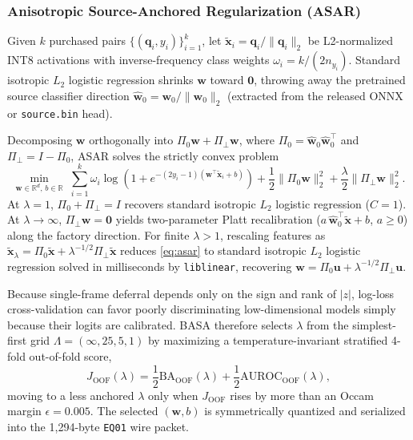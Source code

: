 \documentclass[preprint,12pt,authoryear]{elsarticle}
\newcommand{\BA}{\mathrm{BA}}
\begin{document}
\subsubsection{Anisotropic Source-Anchored Regularization (ASAR)}
Given $k$ purchased pairs $\{(\mathbf{q}_i, y_i)\}_{i=1}^k$, let $\tilde{\mathbf{x}}_i = \mathbf{q}_i / \|\mathbf{q}_i\|_2$ be L2-normalized INT8 activations with inverse-frequency class weights $\omega_i = k / (2 n_{y_i})$. Standard isotropic $L_2$ logistic regression shrinks $\mathbf{w}$ toward $\mathbf{0}$, throwing away the pretrained source classifier direction $\hat{\mathbf{w}}_0 = \mathbf{w}_0 / \|\mathbf{w}_0\|_2$ (extracted from the released ONNX or \texttt{source.bin} head).

Decomposing $\mathbf{w}$ orthogonally into $\Pi_0 \mathbf{w} + \Pi_\perp \mathbf{w}$, where $\Pi_0 = \hat{\mathbf{w}}_0 \hat{\mathbf{w}}_0^\top$ and $\Pi_\perp = I - \Pi_0$, ASAR solves the strictly convex problem
\begin{equation}
  \min_{\mathbf{w} \in \mathbb{R}^d,\, b \in \mathbb{R}} \;
  \sum_{i=1}^{k} \omega_i \log\!\left(1 + e^{-(2y_i-1)(\mathbf{w}^\top \tilde{\mathbf{x}}_i + b)}\right)
  + \frac{1}{2}\|\Pi_0 \mathbf{w}\|_2^2 + \frac{\lambda}{2}\|\Pi_\perp \mathbf{w}\|_2^2.
  \label{eq:asar}
\end{equation}
At $\lambda = 1$, $\Pi_0 + \Pi_\perp = I$ recovers standard isotropic $L_2$ logistic regression ($C=1$). At $\lambda \to \infty$, $\Pi_\perp \mathbf{w} = \mathbf{0}$ yields two-parameter Platt recalibration ($a\,\hat{\mathbf{w}}_0^\top \tilde{\mathbf{x}} + b$, $a \ge 0$) along the factory direction. For finite $\lambda > 1$, rescaling features as $\tilde{\mathbf{x}}_\lambda = \Pi_0 \tilde{\mathbf{x}} + \lambda^{-1/2}\Pi_\perp \tilde{\mathbf{x}}$ reduces \eqref{eq:asar} to standard isotropic $L_2$ logistic regression solved in milliseconds by \texttt{liblinear}, recovering $\mathbf{w} = \Pi_0 \mathbf{u} + \lambda^{-1/2}\Pi_\perp \mathbf{u}$.

Because single-frame deferral depends only on the sign and rank of $|z|$, log-loss cross-validation can favor poorly discriminating low-dimensional models simply because their logits are calibrated. BASA therefore selects $\lambda$ from the simplest-first grid $\Lambda = (\infty, 25, 5, 1)$ by maximizing a temperature-invariant stratified 4-fold out-of-fold score,
\begin{equation}
  J_{\mathrm{OOF}}(\lambda) = \frac{1}{2}\BA_{\mathrm{OOF}}(\lambda) + \frac{1}{2}\mathrm{AUROC}_{\mathrm{OOF}}(\lambda),
  \label{eq:oof}
\end{equation}
moving to a less anchored $\lambda$ only when $J_{\mathrm{OOF}}$ rises by more than an Occam margin $\epsilon = 0.005$. The selected $(\mathbf{w}, b)$ is symmetrically quantized and serialized into the 1,294-byte \texttt{EQ01} wire packet.
\end{document}
